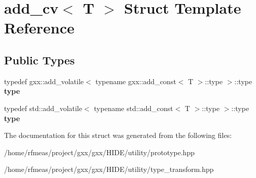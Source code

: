 \hypertarget{structadd__cv}{}\section{add\+\_\+cv$<$ T $>$ Struct Template Reference}
\label{structadd__cv}
\subsection*{Public Types}
\begin{DoxyCompactItemize}
\item 
typedef gxx\+::add\+\_\+volatile$<$ typename gxx\+::add\+\_\+const$<$ T $>$\+::type $>$\+::type {\bfseries type}\hypertarget{structadd__cv_ad3bbcdcd6617c27e9dd4ca35242f3390}{}\label{structadd__cv_ad3bbcdcd6617c27e9dd4ca35242f3390}

\item 
typedef std\+::add\+\_\+volatile$<$ typename std\+::add\+\_\+const$<$ T $>$\+::type $>$\+::type {\bfseries type}\hypertarget{structadd__cv_aa1c92f7488a108f6a09ae3c3d5b238ef}{}\label{structadd__cv_aa1c92f7488a108f6a09ae3c3d5b238ef}

\end{DoxyCompactItemize}


The documentation for this struct was generated from the following files\+:\begin{DoxyCompactItemize}
\item 
/home/rfmeas/project/gxx/gxx/\+H\+I\+D\+E/utility/prototype.\+hpp\item 
/home/rfmeas/project/gxx/gxx/\+H\+I\+D\+E/utility/type\+\_\+transform.\+hpp\end{DoxyCompactItemize}

